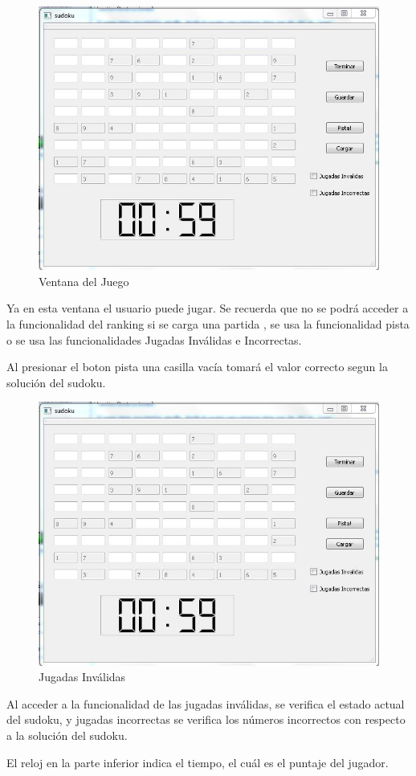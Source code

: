 \begin{figure}[htbp]
\begin{center}
\includegraphics[width=.60\textwidth]{./imagenes/3.jpg}
\caption{Ventana del Juego}
\label{Ventana del Juego}
\end{center}
\end{figure}

Ya en esta ventana el usuario puede jugar. Se recuerda que no se podrá acceder a la funcionalidad del ranking si se carga una partida , se usa la funcionalidad pista o se usa las funcionalidades Jugadas Inválidas e Incorrectas.

Al presionar el boton pista una casilla vacía tomará el valor correcto segun la solución del sudoku.

\begin{figure}[htbp]
\begin{center}
\includegraphics[width=.60\textwidth]{./imagenes/3.jpg}
\caption{Jugadas Inválidas}
\label{Jugadas Inválidas}
\end{center}
\end{figure}

Al acceder a la funcionalidad de las jugadas inválidas, se verifica el estado actual del sudoku, y jugadas incorrectas se verifica los números incorrectos con respecto a la solución del sudoku.

El reloj en la parte inferior indica el tiempo, el cuál es el puntaje del jugador.